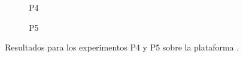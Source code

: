 \begin{figure}
  \centering
    \begin{subfigure}{0.75\textwidth}
      \centering
      \caption{P4}
    \end{subfigure}

    \vspace{0.5cm}

    \begin{subfigure}{0.75\textwidth}
      \centering
      \caption{P5}
    \end{subfigure}  
  \caption{Resultados para los experimentos P4 y P5 sobre la plataforma
    \juno.}
  \label{fig:p4-p5}
\end{figure}


